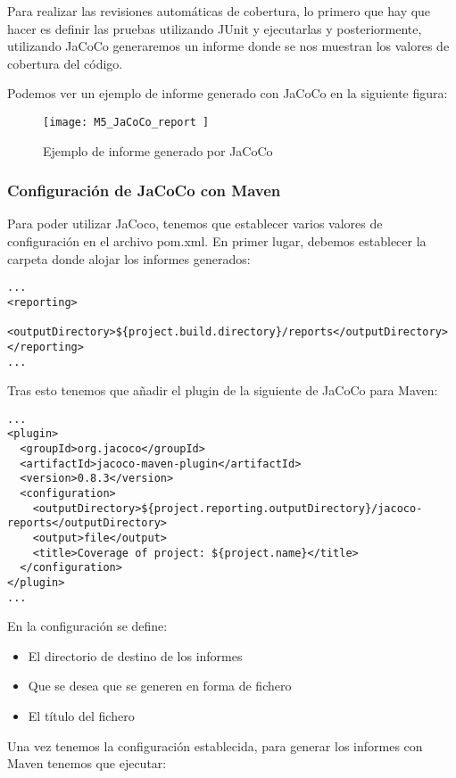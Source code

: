 Para realizar las revisiones automáticas de cobertura, lo primero que hay que hacer es definir las pruebas utilizando JUnit y ejecutarlas y posteriormente, utilizando JaCoCo generaremos un informe donde se nos muestran los valores de cobertura del código.

Podemos ver un ejemplo de informe generado con JaCoCo en la siguiente figura:

\begin{figure}[!h]
	\centering
	\texttt{[image: M5\_JaCoCo\_report ]}
	\caption{Ejemplo de informe generado por JaCoCo}\label{fig:M5_JaCoCo_report}
\end{figure}
\FloatBarrier


\subsubsection{Configuración de JaCoCo con Maven}

Para poder utilizar JaCoco, tenemos que establecer varios valores de configuración en el archivo pom.xml. En primer lugar, debemos establecer la carpeta donde alojar los informes generados:\\
\begin{minipage}{\linewidth}
{\tiny
\begin{verbatim}
...
<reporting>
  <outputDirectory>${project.build.directory}/reports</outputDirectory>
</reporting>
...
\end{verbatim}
}
\end{minipage}
Tras esto tenemos que añadir el plugin de la siguiente de JaCoCo para Maven:\\
\begin{minipage}{\linewidth}
{\tiny
\begin{verbatim}
...
<plugin>
  <groupId>org.jacoco</groupId>
  <artifactId>jacoco-maven-plugin</artifactId>
  <version>0.8.3</version>
  <configuration>
	<outputDirectory>${project.reporting.outputDirectory}/jacoco-reports</outputDirectory>
	<output>file</output>
	<title>Coverage of project: ${project.name}</title>
  </configuration>
</plugin>
...
\end{verbatim}
}
\end{minipage}
En la configuración se define:
\begin{itemize}
	\tightlist
	\item El directorio de destino de los informes
	\item Que se desea que se generen en forma de fichero
	\item El título del fichero
\end{itemize}
 Una vez tenemos la configuración establecida, para generar los informes con Maven tenemos que ejecutar:
 
